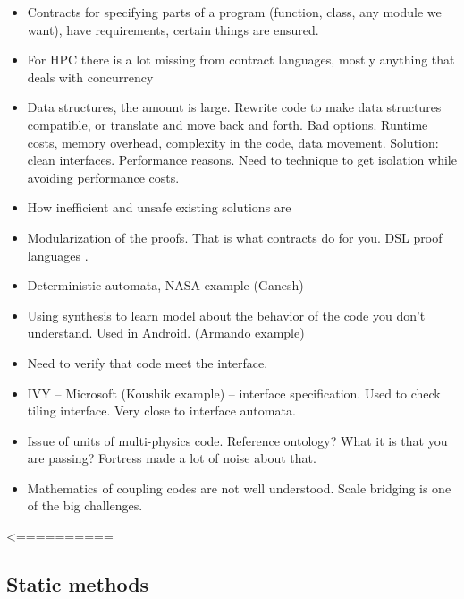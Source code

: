{ 
\begin{itemize}
\item Contracts for specifying parts of a program (function, class, any module we want), have requirements, certain things are ensured.

\item For HPC there is a lot missing from contract languages, mostly anything that deals with concurrency

\item Data structures, the amount is large. Rewrite code to make data structures compatible, or translate and move back and forth. Bad options. Runtime costs, memory overhead, complexity in the code, data movement. Solution: clean interfaces. Performance reasons. Need to technique to get isolation while avoiding performance costs. 

\item How inefficient and unsafe existing solutions are


\item Modularization of the proofs. That is what contracts do for you. DSL proof languages . 

\item Deterministic automata, NASA example (Ganesh)

\item Using synthesis to learn model about the behavior of the code you don’t understand.  Used in Android. (Armando example)

\item Need to verify that code meet the interface. 

\item IVY – Microsoft (Koushik example) – interface specification. Used to check tiling interface. Very close to interface automata. 

\item Issue of units of multi-physics code. Reference ontology? What it is that you are passing?  Fortress made a lot of noise about that. 

\item Mathematics of coupling codes are not well understood. Scale bridging is one of the big challenges. 

\end{itemize}


<==========}


\subsection{Static methods}
\label{sec:static-methods}

